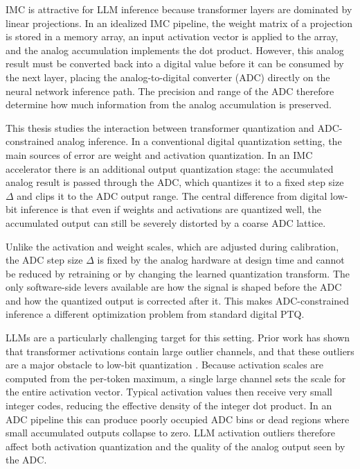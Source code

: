 \documentclass[a4paper,11pt,oneside]{article}
\theoremstyle{breakstyle}
\begin{document}
IMC is attractive for LLM inference because transformer layers are
dominated by linear projections. In an idealized IMC pipeline, the weight
matrix of a projection is stored in a memory array, an input activation
vector is applied to the array, and the analog accumulation implements
the dot product. However, this analog result must be converted back into
a digital value before it can be consumed by the next layer, placing the
analog-to-digital converter (ADC) directly on the neural network
inference path. The precision and range of the ADC therefore determine
how much information from the analog accumulation is preserved.

This thesis studies the interaction between transformer quantization and
ADC-constrained analog inference. In a conventional digital quantization
setting, the main sources of error are weight and activation quantization.
In an IMC accelerator there is an additional output quantization stage:
the accumulated analog result is passed through the ADC, which
quantizes it to a fixed step size $\Delta$ and clips it to the
ADC output range. The central difference from digital low-bit inference
is that even if weights and activations are quantized well, the
accumulated output can still be severely distorted by a coarse ADC
lattice.

Unlike the activation and weight scales, which are adjusted during
calibration, the ADC step size $\Delta$ is fixed by the analog hardware
at design time and cannot be reduced by retraining or by changing the
learned quantization transform. The only software-side levers available
are how the signal is shaped before the ADC and how the quantized output
is corrected after it. This makes ADC-constrained inference a different
optimization problem from standard digital PTQ.

LLMs are a particularly challenging target for this setting. Prior work
has shown that transformer activations contain large outlier channels,
and that these outliers are a major obstacle to low-bit quantization
\cite{LLMint82022,SmoothQuant2022,OutlierSuppressionPlus2023,
QuaRot2024,SpinQuant2024}. Because activation scales are computed from
the per-token maximum, a single large channel sets the scale for the
entire activation vector. Typical activation values then receive very small integer
codes, reducing the effective density of the integer dot product. In an
ADC pipeline this can produce poorly occupied ADC bins or dead regions
where small accumulated outputs collapse to zero. LLM activation
outliers therefore affect both activation quantization and the
quality of the analog output seen by the ADC.
\end{document}
